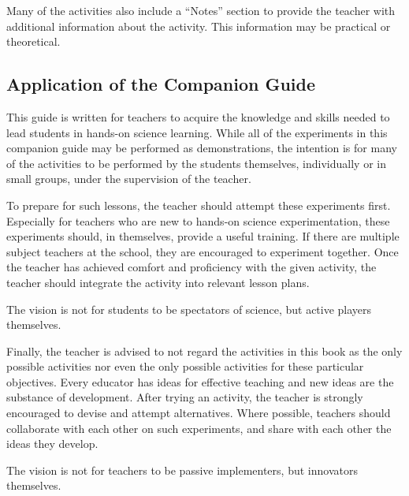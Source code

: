 Many of the activities also include a ``Notes'' section to provide the teacher with additional information about the activity. This information may be practical or theoretical.

\subsection*{Application of the Companion Guide}

This guide is written for teachers to acquire the knowledge and skills needed to lead students in hands-on science learning. While all of the experiments in this companion guide may be performed as demonstrations, the intention is for many of the activities to be performed by the students themselves, individually or in small groups, under the supervision of the teacher.

To prepare for such lessons, the teacher should attempt these experiments first. Especially for teachers who are new to hands-on science experimentation, these experiments should, in themselves, provide a useful training. If there are multiple subject teachers at the school, they are encouraged to experiment together. Once the teacher has achieved comfort and proficiency with the given activity, the teacher should integrate the activity into relevant lesson plans.

The vision is not for students to be spectators of science, but active players themselves.

Finally, the teacher is advised to not regard the activities in this book as the only possible activities nor even the only possible activities for these particular objectives. Every educator has ideas for effective teaching and new ideas are the substance of development. After trying an activity, the teacher is strongly encouraged to devise and attempt alternatives. Where possible, teachers should collaborate with each other on such experiments, and share with each other the ideas they develop.

The vision is not for teachers to be passive implementers, but innovators themselves.
